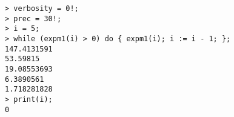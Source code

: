 \begin{center}\begin{minipage}{15cm}\begin{Verbatim}[frame=single]
> verbosity = 0!;
> prec = 30!;
> i = 5;
> while (expm1(i) > 0) do { expm1(i); i := i - 1; };
147.4131591
53.59815
19.08553693
6.3890561
1.718281828
> print(i);
0
\end{Verbatim}
\end{minipage}\end{center}
